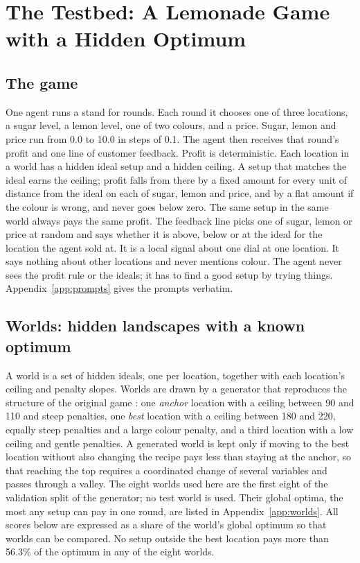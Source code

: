 \section{The Testbed: A Lemonade Game with a Hidden Optimum}\label{sec:method}

\subsection{The game}\label{sec:game}

One agent runs a stand for \NRounds{} rounds. Each round it chooses one of three locations, a sugar level, a
lemon level, one of two colours, and a price. Sugar, lemon and price run from 0.0 to 10.0 in steps of 0.1. The
agent then receives that round's profit and one line of customer feedback. Profit is deterministic. Each
location in a world has a hidden ideal setup and a hidden ceiling. A setup that matches the ideal earns the
ceiling; profit falls from there by a fixed amount for every unit of distance from the ideal on each of sugar,
lemon and price, and by a flat amount if the colour is wrong, and never goes below zero. The same setup in the same world always pays
the same profit. The feedback line picks one of sugar, lemon or price at random and says whether it is above,
below or at the ideal for the location the agent sold at. It is a local signal about one dial at one
location. It says nothing about other locations and never mentions colour. The agent never sees the profit
rule or the ideals; it has to find a good setup by trying things. Appendix~\ref{app:prompts} gives the
prompts verbatim.

\subsection{Worlds: hidden landscapes with a known optimum}\label{sec:worlds}

A world is a set of hidden ideals, one per location, together with each location's ceiling and penalty
slopes. Worlds are drawn by a generator that reproduces the structure of the original game
\citep{ederer2013pay}: one \emph{anchor} location with a ceiling between 90 and 110 and steep penalties, one
\emph{best} location with a ceiling between 180 and 220, equally steep penalties and a large colour penalty,
and a third location with a low ceiling and gentle penalties. A generated world is kept only if moving to the
best location without also changing the recipe pays less than staying at the anchor, so that reaching the top
requires a coordinated change of several variables and passes through a valley. The eight worlds used here
are the first eight of the validation split of the generator; no test world is used. Their global optima, the
most any setup can pay in one round, are listed in Appendix~\ref{app:worlds}. All scores below are expressed
as a share of the world's global optimum so that worlds can be compared. No setup outside the best location
pays more than 56.3\% of the optimum in any of the eight worlds.

